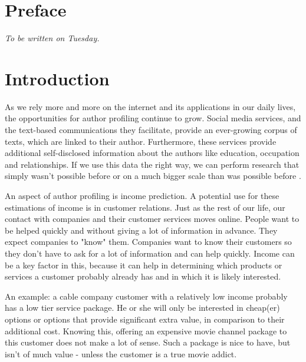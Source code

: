 \documentclass[
10pt, %
a4paper, %
oneside, %
headinclude,footinclude, %
] {book}%
\begin{document}




\chapter*{Preface}

\textit{To be written on Tuesday.}



\chapter{Introduction}
As we rely more and more on the internet and its applications in our daily lives, the opportunities for author profiling continue to grow. Social media services, and the text-based communications they facilitate, provide an ever-growing corpus of texts, which are linked to their author. Furthermore, these services provide additional self-disclosed information about the authors like education, occupation and relationships. If we use this data the right way, we can perform research that simply wasn't possible before or on a much bigger scale than was possible before \citep{sloan}.


An aspect of author profiling is income prediction. A potential use for these estimations of income is in customer relations. Just as the rest of our life, our contact with companies and their customer services moves online. People want to be helped quickly and without giving a lot of information in advance. They expect companies to "know" them. Companies want to know their customers so they don't have to ask for a lot of information and can help quickly. Income can be a key factor in this, because it can help in determining which products or services a customer probably already has and in which it is likely interested.

An example: a cable company customer with a relatively low income probably has a low tier service package. He or she will only be interested in cheap(er) options or options that provide significant extra value, in comparison to their additional cost. Knowing this, offering an expensive movie channel package to this customer does not make a lot of sense. Such a package is nice to have, but isn't of much value - unless the customer is a true movie addict.
\end{document}
